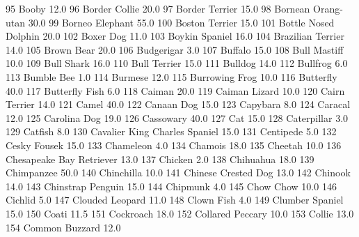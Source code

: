 \documentclass[a4paper]{article}
\begin{document}
\begin{Schunk}
\begin{Soutput}
95                           Booby     12.0
96                   Border Collie     20.0
97                  Border Terrier     15.0
98              Bornean Orang-utan     30.0
99                 Borneo Elephant     55.0
100                 Boston Terrier     15.0
101           Bottle Nosed Dolphin     20.0
102                      Boxer Dog     11.0
103                 Boykin Spaniel     16.0
104              Brazilian Terrier     14.0
105                     Brown Bear     20.0
106                     Budgerigar      3.0
107                        Buffalo     15.0
108                   Bull Mastiff     10.0
109                     Bull Shark     16.0
110                   Bull Terrier     15.0
111                        Bulldog     14.0
112                       Bullfrog      6.0
113                     Bumble Bee      1.0
114                        Burmese     12.0
115                 Burrowing Frog     10.0
116                      Butterfly     40.0
117                 Butterfly Fish      6.0
118                         Caiman     20.0
119                  Caiman Lizard     10.0
120                  Cairn Terrier     14.0
121                          Camel     40.0
122                     Canaan Dog     15.0
123                       Capybara      8.0
124                        Caracal     12.0
125                   Carolina Dog     19.0
126                      Cassowary     40.0
127                            Cat     15.0
128                    Caterpillar      3.0
129                        Catfish      8.0
130  Cavalier King Charles Spaniel     15.0
131                      Centipede      5.0
132                   Cesky Fousek     15.0
133                      Chameleon      4.0
134                        Chamois     18.0
135                        Cheetah     10.0
136       Chesapeake Bay Retriever     13.0
137                        Chicken      2.0
138                      Chihuahua     18.0
139                     Chimpanzee     50.0
140                     Chinchilla     10.0
141            Chinese Crested Dog     13.0
142                        Chinook     14.0
143              Chinstrap Penguin     15.0
144                       Chipmunk      4.0
145                      Chow Chow     10.0
146                        Cichlid      5.0
147                Clouded Leopard     11.0
148                     Clown Fish      4.0
149                Clumber Spaniel     15.0
150                          Coati     11.5
151                      Cockroach     18.0
152               Collared Peccary     10.0
153                         Collie     13.0
154                 Common Buzzard     12.0

\end{Soutput}
\end{Schunk}
\end{document}
